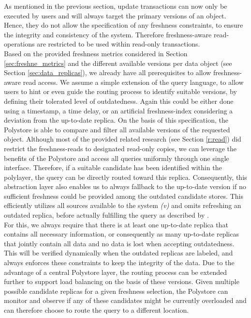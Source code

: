 As mentioned in the previous section, update transactions can now only be executed by users and will always target the primary versions of an object.
Hence, they do not allow the specification of any freshness constraints, to ensure the integrity and consistency of the system.
Therefore freshness-aware read-operations are restricted to be used within read-only transactions.\\
Based on the provided freshness metrics considered in Section \ref{sec:freshne_metrics} and the different available versions per data object (see Section \ref{sec:data_replicas}),
we already have all prerequisites to allow freshness-aware read access. 
We assume a simple extension of the query language, to allow users to hint or even guide the routing process to identify suitable versions, 
by defining their tolerated level of outdatedness.
Again this could be either done using a timestamp, a time delay, or an artificial freshness-index considering a deviation from the up-to-date replica.
On the basis of this specification, the Polystore is able to compare and filter all available versions of the requested object.
Although most of the provided related research (see Section \ref{r:read}) did restrict the freshness-reads to designated read-only copies, we can leverage the benefits 
of the Polystore and access all queries uniformly through one single interface. Therefore, if a suitable candidate has been identified within the polylayer, 
the query can be directly routed toward this replica. Consequently, this abstraction layer also enables us to always fallback to the up-to-date version
if no sufficient freshness could be provided among the outdated candidate stores. This efficiently utilizes all sources available to the system \textit{(v)}
and omits refreshing an outdated replica, before actually fulfilling the query as described by \cite{voicu:2010}.\\
For this, we always require that there is at least one up-to-date replica that contains all necessary information, or consequently as many up-to-date replicas 
that jointly contain all data and no data is lost when accepting outdatedness.
This will be verified dynamically when the outdated replicas are labeled, and always enforces these constraints to keep the integrity of the data.
Due to the advantage of a central Polystore layer, the routing process can be extended further to support load balancing on the basis of these versions. 
Given multiple possible candidate replicas for a given freshness selection, the Polystore can monitor and observe 
if any of these candidates might be currently overloaded and can therefore choose to route the query to a different location.
